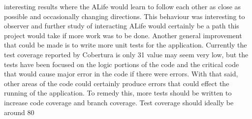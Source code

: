 \documentclass[12pt]{article}
\begin{document}
interesting results where the ALife would learn to follow each other as close as possible and occasionally changing directions. This behaviour was
interesting to observer and further study of interacting ALife would certainly be a path this project would take if more work was to be done.
Another general improvement that could be made is to write more unit tests for the application. Currently the test coverage reported by Cobertura is only 31%
value may seem very low, but the tests have been focused on the logic portions of the code and the critical code that would cause major error in the code if there 
were errors. With that said, other areas of the code could certainly produce errors that could effect the running of the application. To remedy this, more tests
should be written to increase code coverage and branch coverage. Test coverage should ideally be around 80%





\end{document}
